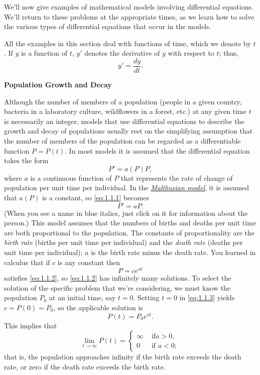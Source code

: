 \documentclass{ximera}
\begin{document}
We'll  now give  examples of mathematical models involving
differential equations. We'll return to these problems at the
appropriate times, as we learn how to solve the various types of
differential equations that occur in the models.

All the examples in this section deal with functions of time, which we
 denote by $t$. If $y$ is a function of $t$,  $y'$
denotes the derivative of $y$ with respect to $t$;   thus,
$$
y'=\frac{dy}{dt}.
$$

\textbf{Population Growth and Decay}

\noindent
Although the number of members of a population (people in a given
country, bacteria in a laboratory culture, wildflowers in a forest,
etc.)
at any given time $t$ is necessarily an integer, models that use
differential equations to describe the growth and decay of populations
usually rest on the simplifying assumption that the number of members of
the population can be regarded as a differentiable function $P=P(t)$.
In most models it is assumed that the differential equation takes the
form
\begin{equation} \label{eq:1.1.1}
P'=a(P)P,
\end{equation}
where $a$ is a continuous function of $P$ that represents the rate of
change of population per unit time per individual.
In the
\href{http://en.wikipedia.org/wiki/Thomas_Robert_Malthus}
{\color{blue}\it Malthusian model},
 it is assumed that
$a(P)$ is a constant, so \eqref{eq:1.1.1} becomes
\begin{equation} \label{eq:1.1.2}
P'=aP.
\end{equation}
\color{blue}
(When you see a name in blue italics, just click on it for
information about the person.)
\color{black}
This model assumes that the numbers of births and deaths per unit time
are both proportional to the population. The constants of
proportionality are  the {\color{blue}\it birth rate\/} (births per unit
time per individual) and the {\color{blue}\it death rate\/} (deaths per unit time
per individual);     $a$ is the birth rate minus the death rate.
You  learned in calculus that if $c$ is any constant then
\begin{equation} \label{eq:1.1.3}
P=ce^{at}
\end{equation}
satisfies \eqref{eq:1.1.2}, so \eqref{eq:1.1.2} has infinitely
many solutions. To select the solution of the specific problem that
we're considering, we must know the population $P_0$ at an initial
time, say $t=0$. Setting $t=0$ in \eqref{eq:1.1.3} yields
$c=P(0)=P_0$, so the applicable solution is
$$
P(t)=P_0e^{at}.
$$
This implies that
$$
\lim_{t\to\infty}P(t)=\left\{\begin{array}{cl}\infty&\mbox{ if
}a>0,\\ 0&\mbox{ if }a<0;    \end{array}\right.
$$
that is, the population approaches infinity if the birth rate exceeds
the death rate, or zero if the death rate exceeds the birth rate.
\end{document}
